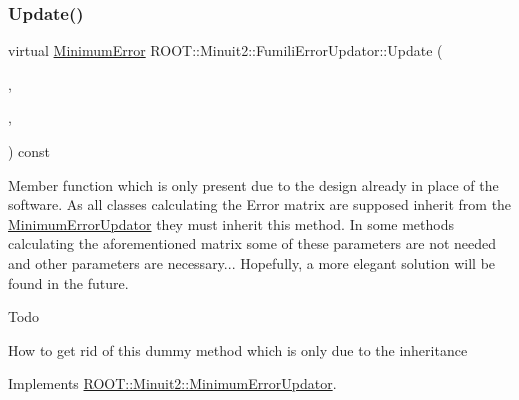 \subsubsection{\texorpdfstring{Update()}{Update()}\hspace{0.1cm}{\footnotesize\ttfamily [3/4]}}
{\footnotesize\ttfamily virtual \mbox{\hyperlink{classROOT_1_1Minuit2_1_1MinimumError}{Minimum\+Error}} R\+O\+O\+T\+::\+Minuit2\+::\+Fumili\+Error\+Updator\+::\+Update (\begin{DoxyParamCaption}\item[{const \mbox{\hyperlink{classROOT_1_1Minuit2_1_1MinimumState}{Minimum\+State}} \&}]{,  }\item[{const \mbox{\hyperlink{classROOT_1_1Minuit2_1_1MinimumParameters}{Minimum\+Parameters}} \&}]{,  }\item[{const \mbox{\hyperlink{classROOT_1_1Minuit2_1_1FunctionGradient}{Function\+Gradient}} \&}]{ }\end{DoxyParamCaption}) const\hspace{0.3cm}{\ttfamily [virtual]}}

Member function which is only present due to the design already in place of the software. As all classes calculating the Error matrix are supposed inherit from the \mbox{\hyperlink{classROOT_1_1Minuit2_1_1MinimumErrorUpdator}{Minimum\+Error\+Updator}} they must inherit this method. In some methods calculating the aforementioned matrix some of these parameters are not needed and other parameters are necessary... Hopefully, a more elegant solution will be found in the future.

\begin{DoxyRefDesc}{Todo}
\item[\mbox{\hyperlink{todo__todo000019}{Todo}}]How to get rid of this dummy method which is only due to the inheritance\end{DoxyRefDesc}


Implements \mbox{\hyperlink{classROOT_1_1Minuit2_1_1MinimumErrorUpdator_ae75c33152c49ebf34e6119adc0bbbda9}{R\+O\+O\+T\+::\+Minuit2\+::\+Minimum\+Error\+Updator}}.

\mbox{\label{classROOT_1_1Minuit2_1_1FumiliErrorUpdator_ae5ee7f2052c474169dd19ffbc3755bd3}} 
